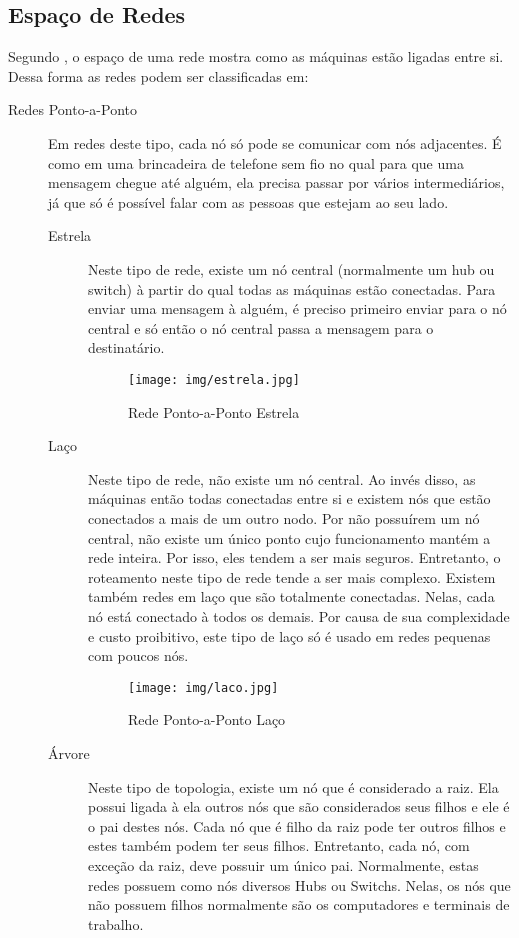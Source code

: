 	\subsection{Espaço de Redes}
	Segundo \cite{farias2006essncial}, o espaço de uma rede mostra como as máquinas estão ligadas entre si. Dessa forma as redes podem ser classificadas em:
	\begin{description}
		\item[Redes Ponto-a-Ponto] Em redes deste tipo, cada nó só pode se comunicar com nós adjacentes. É como em uma brincadeira de telefone sem fio no qual para que uma mensagem chegue até alguém, ela precisa passar por vários intermediários, já que só é possível falar com as pessoas que estejam ao seu lado.
			\begin{description}
				\item[Estrela] Neste tipo de rede, existe um nó central (normalmente um hub ou switch) à partir do qual todas as máquinas estão conectadas. Para enviar uma mensagem à alguém, é preciso primeiro enviar para o nó central e só então o nó central passa a mensagem para o destinatário.
					\begin{figure}[!htb]
						\centering
						\texttt{[image: img/estrela.jpg]}
						\caption{Rede Ponto-a-Ponto Estrela}
						\label{Rede Estrela}
					\end{figure}
				\item[Laço] Neste tipo de rede, não existe um nó central. Ao invés disso, as máquinas então todas conectadas entre si e existem nós que estão conectados a mais de um outro nodo. Por não possuírem um nó central, não existe um único ponto cujo funcionamento mantém a rede inteira. Por isso, eles tendem a ser mais seguros. Entretanto, o roteamento neste tipo de rede tende a ser mais complexo. Existem também redes em laço que são totalmente conectadas. Nelas, cada nó está conectado à todos os demais. Por causa de sua complexidade e custo proibitivo, este tipo de laço só é usado em redes pequenas com poucos nós.
					\begin{figure}[!htb]
						\centering
						\texttt{[image: img/laco.jpg]}
						\caption{Rede Ponto-a-Ponto Laço}
						\label{Rede Laço}
					\end{figure}
				\item[Árvore] Neste tipo de topologia, existe um nó que é considerado a raiz. Ela possui ligada à ela outros nós que são considerados seus filhos e ele é o pai destes nós. Cada nó que é filho da raiz pode ter outros filhos e estes também podem ter seus filhos. Entretanto, cada nó, com exceção da raiz, deve possuir um único pai. Normalmente, estas redes possuem como nós diversos Hubs ou Switchs. Nelas, os nós que não possuem filhos normalmente são os computadores e terminais de trabalho.

\end{description}
\end{description}
